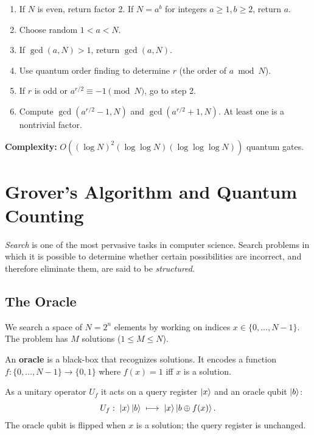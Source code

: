 \documentclass[10pt,a4paper]{article}
\begin{document}
\begin{tcolorbox}[algostyle, title={Algorithm: Shor's Factoring}]
\begin{enumerate}[nosep]
\item If $N$ is even, return factor 2. If $N=a^b$ for integers $a\ge 1, b\ge 2$, return $a$.
\item Choose random $1<a<N$.
\item If $\gcd(a,N)>1$, return $\gcd(a,N)$.
\item Use quantum order finding to determine $r$ (the order of $a\bmod N$).
\item If $r$ is odd or $a^{r/2}\equiv -1\pmod{N}$, go to step 2.
\item Compute $\gcd(a^{r/2}-1,N)$ and $\gcd(a^{r/2}+1,N)$. At least one is a nontrivial factor.
\end{enumerate}
\textbf{Complexity:} $O((\log N)^2(\log\log N)(\log\log\log N))$ quantum gates.
\end{tcolorbox}

\section{Grover's Algorithm and Quantum Counting}
\textit{Search} is one of the most pervasive tasks in computer science. Search problems in which it is possible to determine whether certain possibilities are incorrect, and therefore eliminate them, are said to be \textit{structured}. 
\subsection{The Oracle}

We search a space of $N=2^n$ elements by working on indices $x\in\{0,\dots,N-1\}$. The problem has $M$ solutions ($1\le M\le N$).

\begin{tcolorbox}[defstyle, title={Definition}]
An \textbf{oracle} is a black-box that recognizes solutions. It encodes a function
$f\colon\{0,\dots,N-1\}\to\{0,1\}$ where $f(x)=1$ iff $x$ is a solution.

As a unitary operator $U_f$ it acts on a query register $\ket{x}$ and an oracle qubit $\ket{b}$:
\[
U_f:\;\ket{x}\ket{b}\;\longmapsto\;\ket{x}\ket{b\oplus f(x)}.
\]
The oracle qubit is flipped when $x$ is a solution; the query register is unchanged.
\end{tcolorbox}
\end{document}
